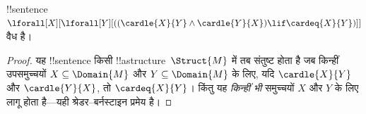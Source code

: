 \documentclass[../../../include/open-logic-section]{subfiles}
\begin{document}
\begin{prop}
!!{sentence} $\lforall[X][\lforall[Y][((\cardle{X}{Y} \land
    \cardle{Y}{X}) \lif \cardeq{X}{Y})]]$ वैध है।
\end{prop}

\begin{proof}
यह !!{sentence} किसी !!a{structure}~$\Struct{M}$ में तब संतुष्ट होता है
जब किन्हीं उपसमुच्चयों $X \subseteq \Domain{M}$ और $Y \subseteq
\Domain{M}$ के लिए, यदि $\cardle{X}{Y}$ और $\cardle{Y}{X}$, तो
$\cardeq{X}{Y}$। किंतु यह \emph{किन्हीं भी} समुच्चयों $X$ और $Y$ के लिए
लागू होता है---यही श्रेडर--बर्नस्टाइन प्रमेय है।
\end{proof}
\end{document}
